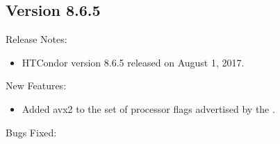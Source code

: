 \subsection*{\label{sec:New-8-6-5}Version 8.6.5}

\noindent Release Notes:

\begin{itemize}

\item HTCondor version 8.6.5 released on August 1, 2017.

\end{itemize}


\noindent New Features:

\begin{itemize}

\item Added avx2 to the set of processor flags advertised by the
.

\end{itemize}

\noindent Bugs Fixed:

